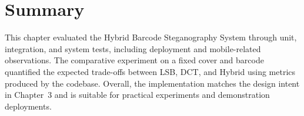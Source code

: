 \section{Summary}

This chapter evaluated the Hybrid Barcode Steganography System through unit, integration, and system tests, including deployment and mobile-related observations. The comparative experiment on a fixed cover and barcode quantified the expected trade-offs between LSB, DCT, and Hybrid using metrics produced by the codebase. Overall, the implementation matches the design intent in Chapter~3 and is suitable for practical experiments and demonstration deployments.
